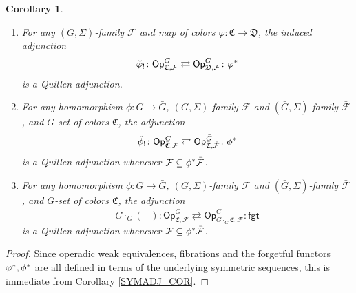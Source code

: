 \documentclass[a4paper,10pt
,draft
]{article}%
\numberwithin{equation}{section}
\numberwithin{figure}{section}
\newtheorem{corollary}[equation]{Corollary}%
\theoremstyle{definition} %
\newcommand{\F}{\ensuremath{\mathcal F}}
\newcommand{\1}{\ensuremath{\mathbbm 1}}%
\begin{document}
\begin{corollary}\label{OPADJ_COR}
\begin{enumerate}[label=(\roman*)]
\item \label{OPCOCHADJ_LBL}
	For any $(G,\Sigma)$-family $\F$ and map of colors 
	$\varphi \colon \mathfrak C \to \mathfrak D$, the induced adjunction
		\[
		\check{\varphi}_! \colon \mathsf{Op}^G_{\mathfrak{C},\F}
			\rightleftarrows
		\mathsf{Op}^G_{\mathfrak{D},\F} \colon \varphi^{\**}
		\]
	is a Quillen adjunction.
\item \label{OPFIXSETCHGR_LBL}
	For any homomorphism $\phi \colon G \to \bar G$,
	$(G,\Sigma)$-family $\F$ and $(\bar G,\Sigma)$-family $\bar{\F}$,
	and $\bar G$-set of colors $\bar{\mathfrak C}$,
	the adjunction
		\[
		\check{\phi}_! \colon \mathsf{Op}^G_{\bar{\mathfrak{C}},\F}
			\rightleftarrows
		\mathsf{Op}^{\bar{G}}_{\bar{\mathfrak{C}},\bar{\F}} \colon \phi^{\**}
		\]
	is a Quillen adjunction whenever $\F \subseteq \phi^{\**} \bar{\F}$.
\item \label{OPCOMBADJ_LBL}
	For any homomorphism $\phi \colon G \to \bar G$,
	$(G,\Sigma)$-family $\F$ and $(\bar G,\Sigma)$-family $\bar{\F}$,
	and $G$-set of colors $\mathfrak C$,
	the adjunction
            \[
                  \bar{G} \cdot_G (-) \colon \mathsf{Op}^G_{\mathfrak{C},\F}
                  \rightleftarrows
                  \mathsf{Op}^{\bar{G}}_{\bar{G} \cdot_G \mathfrak{C},\bar{\F}} \colon \mathsf{fgt}
            \]
	is a Quillen adjunction whenever $\F \subseteq \phi^{\**} \bar{\F}$.
      \end{enumerate}
\end{corollary}

\begin{proof}
	Since operadic weak equivalences, fibrations and the forgetful functors $\varphi^{\**},\phi^{\**}$
	are all defined in terms of the underlying symmetric sequences,
	this is immediate from Corollary \ref{SYMADJ_COR}.
\end{proof}











\end{document}

